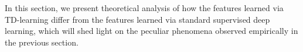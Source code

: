 In this section, we present theoretical analysis of how the features learned via TD-learning differ from the features learned via standard supervised deep learning, which will shed light on the peculiar phenomena observed empirically in the previous section.





